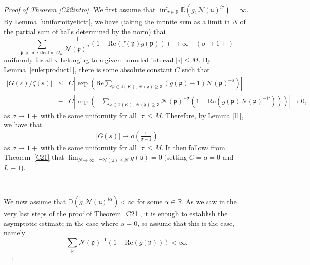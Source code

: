 \documentclass[11pt]{amsart}
\theoremstyle{definition}
\DeclareMathOperator*{\E}{\mathbb{E}}
\newcommand{\D}{{\mathbb D}}
\newcommand{\NN}{{\mathcal N}}
\newcommand{\R}{{\mathbb R}}
\newcommand{\mf}{\mathfrak}
\begin{document}
\begin{proof}[Proof of Theorem \ref{C22intro}]
   We first assume that  $\inf_{\tau\in\R}\D(g,\NN(\mf u)^{i\tau})=\infty$. 
   By Lemma~\ref{uniformityeliott}, we have (taking the infinite sum as a limit in $N$ of the partial sum of balls determined by the norm) that 
    $$\sum_{\mf p\colon \text{prime ideal in } \mathcal{O}_K}\frac{1}{\NN(\mf p)^{\sigma}}(1-\text{Re}(f(\mf p)\overline{g}(\mf p)))\to \infty \quad (\sigma\to 1+)$$
   uniformly for all $\tau$ belonging to a given bounded interval $\vert\tau\vert\leq M$.
   By Lemma~\ref{eulerproduct1}, there is some absolute constant $C$ such that
   \begin{eqnarray*}
       \vert G(s)/\zeta(s)\vert & \leq & C\left|\exp\left(\text{Re}\sum_{\mf p \in \mf I(K), \NN(\mf p)\geq 3}(g(\mf p)-1)\NN(\mf p)^{-s}\right)\right|
  \\& = & C\left|\exp\left(-\sum_{\mf p \in \mf I(K), \NN(\mf p)\geq 3}\NN(\mf p)^{-\sigma}(1-\text{Re}(g(\mf p)\NN(\mf p)^{-i\tau}))\right)\right|\to 0,
   \end{eqnarray*} 
 as $\sigma\to 1+$ with the same uniformity for all  $\vert\tau\vert\leq M$. Therefore, by Lemma \ref{l1}, we have that 
   \begin{equation}\nonumber
   \begin{split}
    \vert G(s)\vert\to o\left(\frac{1}{\sigma-1}\right)  
   \end{split}
   \end{equation}
 as $\sigma\to 1+$ with the same uniformity for all  $\vert\tau\vert\leq M$.
 It then follows from Theorem~\ref{C21} that  $\lim_{N \to \infty} \E_{\NN(\mf u) \leq N} g(\mf u)=0$ (setting $C=\alpha=0$ and $L\equiv 1$).
 
   
   \
   
   We now assume that $\D(g,\NN(\mf u)^{i\alpha})<\infty$ for some $\alpha\in\R$. As we saw in the very last steps of the proof of Theorem~\ref{C21}, it is enough to establish the asymptotic estimate in the case where $\alpha=0$, so assume that this is the case, namely
   \begin{equation}\label{aiso}
       \sum_{\mf p}\NN(\mf p)^{-1}(1-\text{Re}(g(\mf p)))<\infty.
   \end{equation}


\end{proof}
\end{document}
